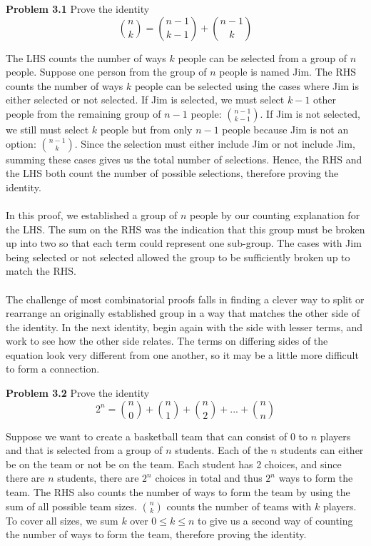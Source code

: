 \documentclass[11pt]{scrartcl}
\begin{document}
\begin{tcolorbox}
\textbf{Problem 3.1} Prove the identity 
    $${n \choose k}={n-1 \choose k-1}+{n-1 \choose k}$$
\end{tcolorbox}
\noindent 
The LHS counts the number of ways $k$ people can be selected from a group of $n$ people. Suppose one person from the group of $n$ people is named Jim. The RHS counts the number of ways $k$ people can be selected using the cases where Jim is either selected or not selected. If Jim is selected, we must select $k-1$ other people from the remaining group of $n-1$ people: ${{{n-1} \choose {k-1}}}$. If Jim is not selected, we still must select $k$ people but from only $n-1$ people because Jim is not an option: ${{{n-1} \choose {k}}}$. Since the selection must either include Jim or not include Jim, summing these cases gives us the total number of selections. Hence, the RHS and the LHS both count the number of possible selections, therefore proving the identity. \\
\\
\noindent 
In this proof, we established a group of $n$ people by our counting explanation for the LHS. The sum on the RHS was the indication that this group must be broken up into two so that each term could represent one sub-group. The cases with Jim being selected or not selected allowed the group to be sufficiently broken up to match the RHS. \\
\\
\noindent 
The challenge of most combinatorial proofs falls in finding a clever way to split or rearrange an originally established group in a way that matches the other side of the identity. In the next identity, begin again with the side with lesser terms, and work to see how the other side relates. The terms on differing sides of the equation look very different from one another, so it may be a little more difficult to form a connection. 
\\
\begin{tcolorbox}
\textbf{Problem 3.2} Prove the identity
 $$2^n={n \choose 0} + {n\choose 1} + {n\choose 2} +...+ {n\choose n}$$
\end{tcolorbox}
\noindent 
Suppose we want to create a basketball team that can consist of 0 to $n$ players and that is selected from a group of $n$ students. Each of the $n$ students can either be on the team or not be on the team. Each student has 2 choices, and since there are $n$ students, there are $2^n$ choices in total and thus $2^n$ ways to form the team. The RHS also counts the number of ways to form the team by using the sum of all possible team sizes. $n \choose k$ counts the number of teams with $k$ players. To cover all sizes, we sum $k$ over $0 \leq k \leq n$ to give us a second way of counting the number of ways to form the team, therefore proving the identity. \\
\end{document}
